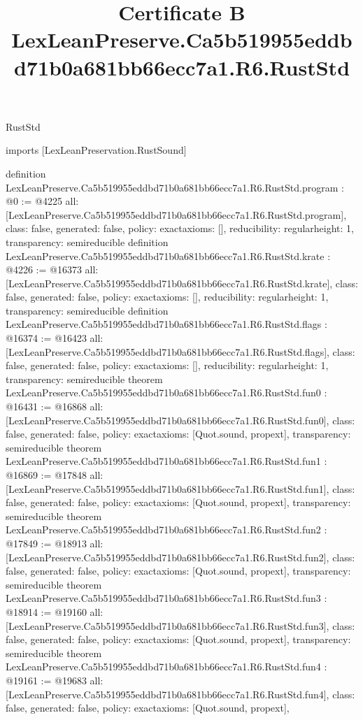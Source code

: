 \begin{lexlean}{RustStd}
\title{Certificate B LexLeanPreserve.Ca5b519955eddbd71b0a681bb66ecc7a1.R6.RustStd}
\begin{coremodule}
imports [LexLeanPreservation.RustSound]

definition LexLeanPreserve.Ca5b519955eddbd71b0a681bb66ecc7a1.R6.RustStd.program : @0 := @4225 {
  all: [LexLeanPreserve.Ca5b519955eddbd71b0a681bb66ecc7a1.R6.RustStd.program],
  class: false,
  generated: false,
  policy: exact{axioms: []},
  reducibility: regular{height: 1},
  transparency: semireducible
}
definition LexLeanPreserve.Ca5b519955eddbd71b0a681bb66ecc7a1.R6.RustStd.krate : @4226 := @16373 {
  all: [LexLeanPreserve.Ca5b519955eddbd71b0a681bb66ecc7a1.R6.RustStd.krate],
  class: false,
  generated: false,
  policy: exact{axioms: []},
  reducibility: regular{height: 1},
  transparency: semireducible
}
definition LexLeanPreserve.Ca5b519955eddbd71b0a681bb66ecc7a1.R6.RustStd.flags : @16374 := @16423 {
  all: [LexLeanPreserve.Ca5b519955eddbd71b0a681bb66ecc7a1.R6.RustStd.flags],
  class: false,
  generated: false,
  policy: exact{axioms: []},
  reducibility: regular{height: 1},
  transparency: semireducible
}
theorem LexLeanPreserve.Ca5b519955eddbd71b0a681bb66ecc7a1.R6.RustStd.fun0 : @16431 := @16868 {
  all: [LexLeanPreserve.Ca5b519955eddbd71b0a681bb66ecc7a1.R6.RustStd.fun0],
  class: false,
  generated: false,
  policy: exact{axioms: [Quot.sound, propext]},
  transparency: semireducible
}
theorem LexLeanPreserve.Ca5b519955eddbd71b0a681bb66ecc7a1.R6.RustStd.fun1 : @16869 := @17848 {
  all: [LexLeanPreserve.Ca5b519955eddbd71b0a681bb66ecc7a1.R6.RustStd.fun1],
  class: false,
  generated: false,
  policy: exact{axioms: [Quot.sound, propext]},
  transparency: semireducible
}
theorem LexLeanPreserve.Ca5b519955eddbd71b0a681bb66ecc7a1.R6.RustStd.fun2 : @17849 := @18913 {
  all: [LexLeanPreserve.Ca5b519955eddbd71b0a681bb66ecc7a1.R6.RustStd.fun2],
  class: false,
  generated: false,
  policy: exact{axioms: [Quot.sound, propext]},
  transparency: semireducible
}
theorem LexLeanPreserve.Ca5b519955eddbd71b0a681bb66ecc7a1.R6.RustStd.fun3 : @18914 := @19160 {
  all: [LexLeanPreserve.Ca5b519955eddbd71b0a681bb66ecc7a1.R6.RustStd.fun3],
  class: false,
  generated: false,
  policy: exact{axioms: [Quot.sound, propext]},
  transparency: semireducible
}
theorem LexLeanPreserve.Ca5b519955eddbd71b0a681bb66ecc7a1.R6.RustStd.fun4 : @19161 := @19683 {
  all: [LexLeanPreserve.Ca5b519955eddbd71b0a681bb66ecc7a1.R6.RustStd.fun4],
  class: false,
  generated: false,
  policy: exact{axioms: [Quot.sound, propext]},
}
\end{coremodule}
\end{lexlean}
